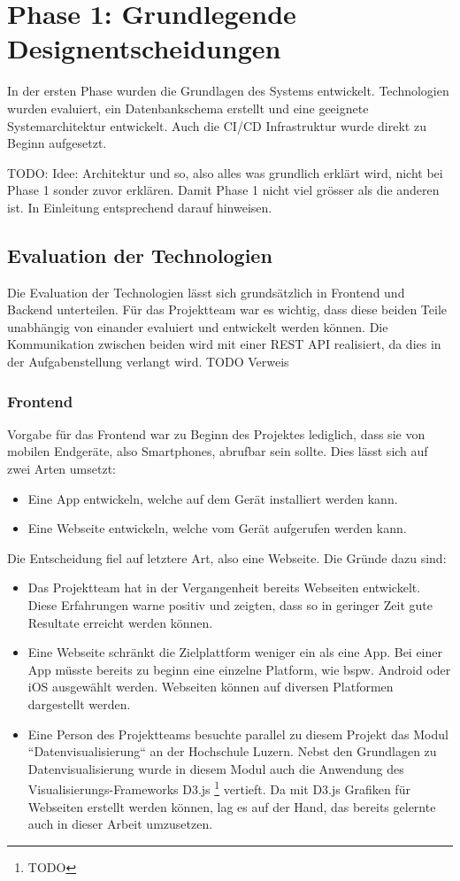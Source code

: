 \section{Phase 1: Grundlegende Designentscheidungen}
In der ersten Phase wurden die Grundlagen des Systems entwickelt.
Technologien wurden evaluiert, ein Datenbankschema erstellt und eine geeignete Systemarchitektur entwickelt.
Auch die \ac{CI/CD} Infrastruktur wurde direkt zu Beginn aufgesetzt.

TODO: Idee: Architektur und so, also alles was grundlich erklärt wird, nicht bei Phase 1 sonder zuvor erklären.
Damit Phase 1 nicht viel grösser als die anderen ist. In Einleitung entsprechend darauf hinweisen.

\subsection{Evaluation der Technologien}
Die Evaluation der Technologien lässt sich grundsätzlich in Frontend und Backend unterteilen.
Für das Projektteam war es wichtig, dass diese beiden Teile unabhängig von einander evaluiert und entwickelt werden können.
Die Kommunikation zwischen beiden wird mit einer \ac{REST} \ac{API} realisiert, da dies in der Aufgabenstellung verlangt wird. TODO Verweis

\subsubsection{Frontend}
Vorgabe für das Frontend war zu Beginn des Projektes lediglich,
dass sie von mobilen Endgeräte, also Smartphones, abrufbar sein sollte.
Dies lässt sich auf zwei Arten umsetzt:
\begin{itemize}
    \item Eine App entwickeln, welche auf dem Gerät installiert werden kann.
    \item Eine Webseite entwickeln, welche vom Gerät aufgerufen werden kann.
\end{itemize}
Die Entscheidung fiel auf letztere Art, also eine Webseite.
Die Gründe dazu sind:
\begin{itemize}
    \item Das Projektteam hat in der Vergangenheit bereits Webseiten entwickelt.
          Diese Erfahrungen warne positiv und zeigten, dass so in geringer Zeit gute Resultate erreicht werden können.
    \item Eine Webseite schränkt die Zielplattform weniger ein als eine App.
          Bei einer App müsste bereits zu beginn eine einzelne Platform, wie bspw. Android oder iOS ausgewählt werden.
          Webseiten können auf diversen Platformen dargestellt werden.
    \item Eine Person des Projektteams besuchte parallel zu diesem Projekt das Modul ``Datenvisualisierung``  an der Hochschule Luzern.
          Nebst den Grundlagen zu Datenvisualisierung wurde in diesem Modul auch die Anwendung des Visualisierungs-Frameworks D3.js \footnote{TODO} vertieft.
          Da mit D3.js Grafiken für Webseiten erstellt werden können, lag es auf der Hand, das bereits gelernte auch in dieser Arbeit umzusetzen.
\end{itemize}

